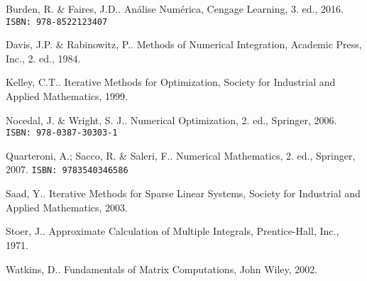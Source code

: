 \documentclass[12pt]{book}
\begin{document}
\begin{thebibliography}{99}
  
    Burden, R. \& Faires, J.D.. Análise Numérica, Cengage Learning, 3. ed., 2016. \texttt{ISBN: 978-8522123407}

    Davis, J.P. \& Rabinowitz, P.. Methods of Numerical Integration, Academic Press, Inc., 2. ed., 1984.

    Kelley, C.T.. Iterative Methods for Optimization, Society for Industrial and Applied Mathematics, 1999.
  
    Nocedal, J. \& Wright, S. J.. Numerical Optimization, 2. ed., Springer, 2006. \texttt{ISBN: 978-0387-30303-1}

    Quarteroni, A.; Sacco, R. \& Saleri, F.. Numerical Mathematics, 2. ed., Springer, 2007. \texttt{ISBN: 9783540346586}

    Saad, Y.. Iterative Methods for Sparse Linear Systems, Society for Industrial and Applied Mathematics, 2003.

    Stoer, J.. Approximate Calculation of Multiple Integrals, Prentice-Hall, Inc., 1971.

    Watkins, D.. Fundamentals of Matrix Computations, John Wiley, 2002.
      
  \end{thebibliography}
  
\end{document}

